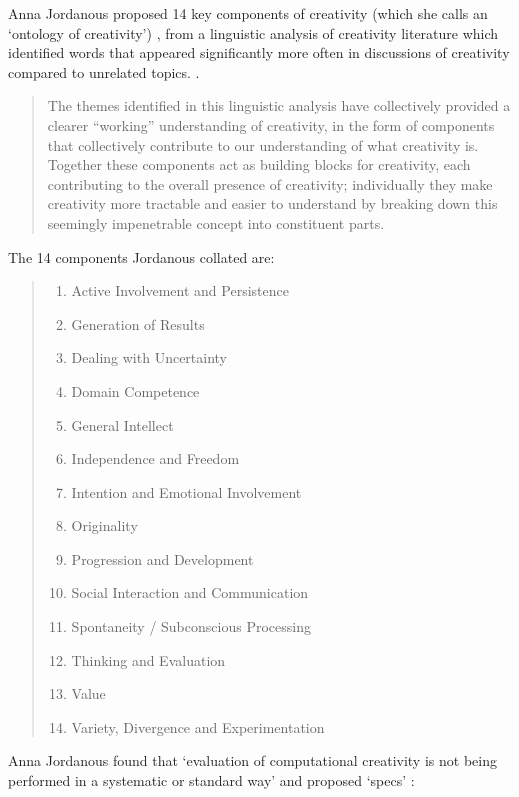 Anna Jordanous proposed 14 key components of creativity (which she calls an  `ontology of creativity') \citeyear[p.104-120]{Jordanous2012}, from a linguistic analysis of creativity literature which identified words that appeared significantly more often in discussions of creativity compared to unrelated topics. \citeyear[p.120]{Jordanous2012}.

\begin{quotation}
  The themes identified in this linguistic analysis have collectively provided a clearer ``working'' understanding of creativity, in the form of components that collectively contribute to our understanding of what creativity is. Together these components act as building blocks for creativity, each contributing to the overall presence of creativity; individually they make creativity more tractable and easier to understand by breaking down this seemingly impenetrable concept into constituent parts. 
\end{quotation}

The 14 components Jordanous collated are: \citeyear[p.118-120]{Jordanous2012}
\begin{quotation}
  \begin{enumerate}
    \item Active Involvement and Persistence
    \item Generation of Results
    \item Dealing with Uncertainty
    \item Domain Competence
    \item General Intellect
    \item Independence and Freedom
    \item Intention and Emotional Involvement
    \item Originality
    \item Progression and Development
    \item Social Interaction and Communication
    \item Spontaneity / Subconscious Processing
    \item Thinking and Evaluation
    \item Value
    \item Variety, Divergence and Experimentation
  \end{enumerate}
\end{quotation}

Anna Jordanous found that `evaluation of computational creativity is not being performed in a systematic or standard way' \autocite[p.2]{Jordanous2011} and proposed `\gls{specs}' \autocite[p.137-140]{Jordanous2012a}:
\label{s:specs}


